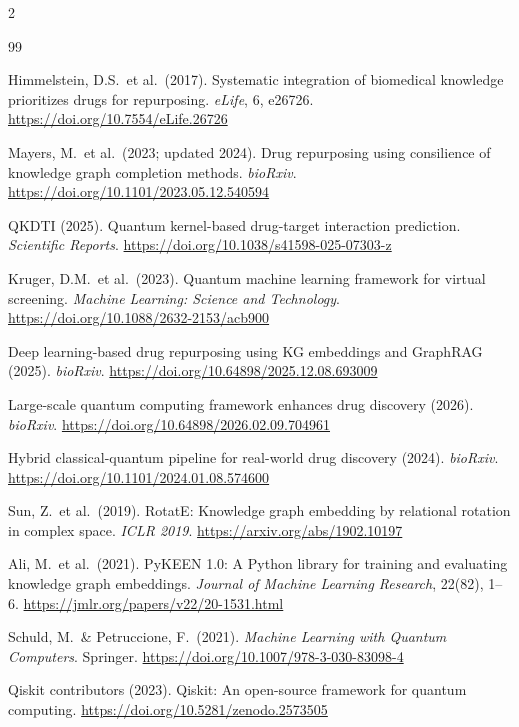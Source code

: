 \documentclass[10pt,twocolumn]{article}
\begin{document}
{\footnotesize
\begin{multicols}{2}
\begin{thebibliography}{99}

Himmelstein, D.S.\ et al.\ (2017).
Systematic integration of biomedical knowledge prioritizes drugs for repurposing.
\textit{eLife}, 6, e26726.
\url{https://doi.org/10.7554/eLife.26726}

Mayers, M.\ et al.\ (2023; updated 2024).
Drug repurposing using consilience of knowledge graph completion methods.
\textit{bioRxiv}.
\url{https://doi.org/10.1101/2023.05.12.540594}

QKDTI (2025).
Quantum kernel-based drug-target interaction prediction.
\textit{Scientific Reports}.
\url{https://doi.org/10.1038/s41598-025-07303-z}

Kruger, D.M.\ et al.\ (2023).
Quantum machine learning framework for virtual screening.
\textit{Machine Learning: Science and Technology}.
\url{https://doi.org/10.1088/2632-2153/acb900}

Deep learning-based drug repurposing using KG embeddings and GraphRAG (2025).
\textit{bioRxiv}.
\url{https://doi.org/10.64898/2025.12.08.693009}

Large-scale quantum computing framework enhances drug discovery (2026).
\textit{bioRxiv}.
\url{https://doi.org/10.64898/2026.02.09.704961}

Hybrid classical-quantum pipeline for real-world drug discovery (2024).
\textit{bioRxiv}.
\url{https://doi.org/10.1101/2024.01.08.574600}

Sun, Z.\ et al.\ (2019).
RotatE: Knowledge graph embedding by relational rotation in complex space.
\textit{ICLR 2019}.
\url{https://arxiv.org/abs/1902.10197}

Ali, M.\ et al.\ (2021).
PyKEEN 1.0: A Python library for training and evaluating knowledge graph embeddings.
\textit{Journal of Machine Learning Research}, 22(82), 1--6.
\url{https://jmlr.org/papers/v22/20-1531.html}

Schuld, M.\ \& Petruccione, F.\ (2021).
\textit{Machine Learning with Quantum Computers}.
Springer.
\url{https://doi.org/10.1007/978-3-030-83098-4}

Qiskit contributors (2023).
Qiskit: An open-source framework for quantum computing.
\url{https://doi.org/10.5281/zenodo.2573505}


\end{thebibliography}
\end{multicols}}
\end{document}
